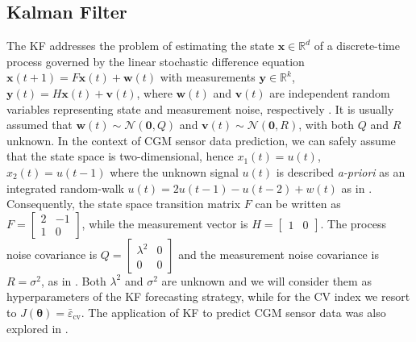 \subsection{Kalman Filter}


The KF addresses the problem of estimating the state $\bm{x} \in \mathbb{R}^d$ of a discrete-time process governed by the linear stochastic difference equation
$\bm{x}(t+1) = F\bm{x}(t) + \bm{w}(t)$
with measurements $\bm{y} \in \mathbb{R}^k$,
$\bm{y}(t) = H\bm{x}(t)+\bm{v}(t)$,
where $\bm{w}(t)$ and $\bm{v}(t)$ are independent random variables representing state and measurement noise, respectively \cite{welch1995introduction}. It is usually assumed that $\bm{w}(t)\sim \mathcal{N}(\bm{0}, Q)$ and $\bm{v}(t)\sim \mathcal{N}(\bm{0}, R)$, with both $Q$ and $R$ unknown. In the context of CGM sensor data prediction, we can safely assume that the state space is two-dimensional, hence $x_1(t)=u(t)$, $x_2(t)=u(t-1)$ where the unknown signal $u(t)$ is described {\em a-priori} as an integrated random-walk $u(t)=2u(t-1)-u(t-2)+w(t)$ as in \cite{facchinetti2010online}. Consequently, the state space transition matrix $F$ can be written as $F=[\begin{smallmatrix}  2 & -1  \\  1 & 0\end{smallmatrix}]$,
while the measurement vector is $H = [\begin{smallmatrix} 1 & 0 \end{smallmatrix}]$. The process noise covariance is
$Q=
[\begin{smallmatrix}
\lambda^2 & 0  \\
0 & 0
\end{smallmatrix}
]$
and the measurement noise covariance is $R = \sigma^2$, as in \cite{facchinetti2010online}. Both $\lambda^2$ and $\sigma^2$ are unknown and we will consider them as hyperparameters of the KF forecasting strategy, while for the CV index we resort to $J(\bm{\theta})= \bar{\varepsilon}_{\text{cv}}$.
The application of KF to predict CGM sensor data was also explored in \cite{facchinetti2010online, knobbe2005extended}.


